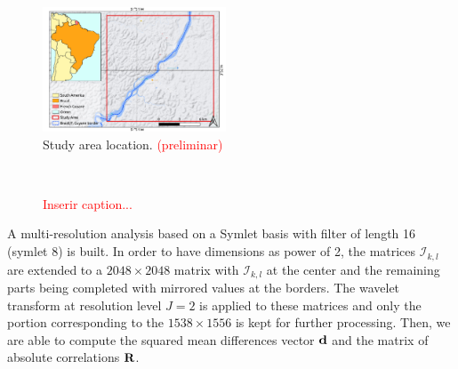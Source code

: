 \documentclass[journal]{IEEEtran}
\newcommand{\vd}{{\textbf d}}
\newcommand{\vR}{{\textbf R}}
\begin{document}
\begin{figure}[hbt]
\centering
\includegraphics[width=0.485\textwidth]{../../qgis/maps/StudyArea.pdf}
\caption{Study area location. \textcolor{red}{(preliminar)}}\label{figAE}
\end{figure}


\begin{figure}[hbt]
\centering

\mbox{
}


\caption{\textcolor{red}{Inserir caption...}}\label{figImageRef}
\end{figure}

A multi-resolution analysis based on a Symlet basis with filter of length 16 (symlet 8) is built. In order to have dimensions as power of 2, the matrices $\mathcal{I}_{k,l}$ are extended to a $2048\times2048$ matrix with $\mathcal{I}_{k,l}$ at the center and the remaining parts being completed with mirrored values at the borders. The wavelet transform at resolution level $J=2$ is applied to these matrices and only the portion corresponding to the $1538 \times 1556$ is kept for further processing. Then, we are able to compute the squared mean differences vector $\vd$ and the matrix of absolute correlations $\vR$. 
\end{document}
